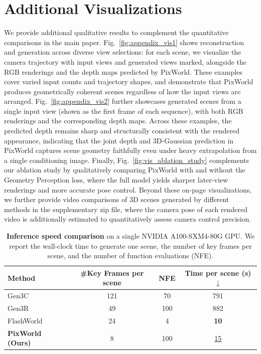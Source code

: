\section{Additional Visualizations}
\label{sec:appendix_vis}
We provide additional qualitative results to complement the quantitative comparisons in the main paper. Fig.~\ref{fig:appendix_vis1} shows reconstruction and generation across diverse view selections: for each scene, we visualize the camera trajectory with input views and generated views marked, alongside the RGB renderings and the depth maps predicted by PixWorld. These examples cover varied input counts and trajectory shapes, and demonstrate that PixWorld produces geometrically coherent scenes regardless of how the input views are arranged. Fig.~\ref{fig:appendix_vis2} further showcases generated scenes from a single input view (shown as the first frame of each sequence), with both RGB renderings and the corresponding depth maps. Across these examples, the predicted depth remains sharp and structurally consistent with the rendered appearance, indicating that the joint depth and 3D-Gaussian prediction in PixWorld captures scene geometry faithfully even under heavy extrapolation from a single conditioning image. Finally, Fig.~\ref{fig:vis_ablation_study} complements our ablation study by qualitatively comparing PixWorld with and without the Geometry Perception loss, where the full model yields sharper later-view renderings and more accurate pose control. Beyond these on-page visualizations, we further provide video comparisons of 3D scenes generated by different methods in the supplementary zip file, where the camera pose of each rendered video is additionally estimated to quantitatively assess camera control precision.


\begin{table}[t]
\centering
\caption{\textbf{Inference speed comparison} on a single NVIDIA A100-SXM4-80G GPU. We report the wall-clock time to generate one scene, the number of key frames per scene, and the number of function evaluations (NFE).}
\label{tab:inference_speed}
\setlength{\tabcolsep}{8pt}
\renewcommand{\arraystretch}{1.05}
\begin{tabular}{l c c c}
\toprule
Method & \#Key Frames per scene & NFE & Time per scene (s) $\downarrow$ \\
\midrule
Gen3C~\citep{ren2025gen3c}          & 121 & 70  & 791 \\
Gen3R~\citep{huang2026gen3r}        & 49  & 100 & 882 \\
FlashWorld~\citep{li2025flashworld} & 24  & 4   & \textbf{10} \\
\rowcolor{cyan!8}
\textbf{PixWorld (Ours)}           & 8   & 100 & \underline{15} \\
\bottomrule
\end{tabular}
\end{table}

